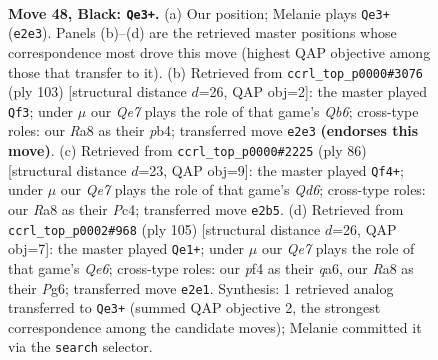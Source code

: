 \documentclass[11pt]{article}
\begin{document}
\clearpage

\begin{figure}[p]\centering
\begin{subfigure}{0.46\textwidth}\centering
\resizebox{\linewidth}{!}{%
\newchessgame
\chessboard[
  setfen={r7/1Q6/4kp2/3p4/5P2/p5P1/P3q2P/6K1 b - - 16 48},
  showmover=false,
  pgfstyle=straightmove, color=movearrow, markmove={e2-e3}
]}
\caption{}
\end{subfigure}\hfill
\begin{subfigure}{0.46\textwidth}\centering
\resizebox{\linewidth}{!}{%
\newchessgame
\chessboard[
  setfen={8/6pk/7p/8/pP5P/Pq4P1/7K/2Q5 b - - 3 52},
  showmover=false,
  pgfstyle=straightmove, color=movearrow, markmove={b3-f3}
]}
\caption{}
\end{subfigure}
\\[4pt]
\begin{subfigure}{0.46\textwidth}\centering
\resizebox{\linewidth}{!}{%
\newchessgame
\chessboard[
  setfen={8/1p3k1p/p2Q2p1/8/P1P5/1q5P/6PK/8 w - - 10 44},
  showmover=false,
  pgfstyle=straightmove, color=movearrow, markmove={d6-f4}
]}
\caption{}
\end{subfigure}\hfill
\begin{subfigure}{0.46\textwidth}\centering
\resizebox{\linewidth}{!}{%
\newchessgame
\chessboard[
  setfen={8/4k3/Q1p2ppp/8/1P6/P3q2P/6P1/7K b - - 8 53},
  showmover=false,
  pgfstyle=straightmove, color=movearrow, markmove={e3-e1}
]}
\caption{}
\end{subfigure}
\caption{\textbf{Move 48, Black: \texttt{Qe3+}.} (a) Our position; Melanie plays \texttt{Qe3+} (\texttt{e2e3}). Panels (b)--(d) are the retrieved master positions whose correspondence most drove this move (highest QAP objective among those that transfer to it). (b) Retrieved from \texttt{ccrl\_top\_p0000\#3076} (ply 103) [structural distance $d$=26, QAP obj=2]: the master played \texttt{Qf3}; under $\mu$ our \emph{Qe7} plays the role of that game's \emph{Qb6}; cross-type roles: our \emph{R}a8 as their \emph{p}b4; transferred move \texttt{e2e3} \textbf{(endorses this move)}. (c) Retrieved from \texttt{ccrl\_top\_p0000\#2225} (ply 86) [structural distance $d$=23, QAP obj=9]: the master played \texttt{Qf4+}; under $\mu$ our \emph{Qe7} plays the role of that game's \emph{Qd6}; cross-type roles: our \emph{R}a8 as their \emph{P}c4; transferred move \texttt{e2b5}. (d) Retrieved from \texttt{ccrl\_top\_p0002\#968} (ply 105) [structural distance $d$=26, QAP obj=7]: the master played \texttt{Qe1+}; under $\mu$ our \emph{Qe7} plays the role of that game's \emph{Qe6}; cross-type roles: our \emph{p}f4 as their \emph{q}a6, our \emph{R}a8 as their \emph{P}g6; transferred move \texttt{e2e1}. Synthesis: 1 retrieved analog transferred to \texttt{Qe3+} (summed QAP objective 2, the strongest correspondence among the candidate moves); Melanie committed it via the \texttt{search} selector.}
\label{fig:thought-m95}
\end{figure}
\end{document}
